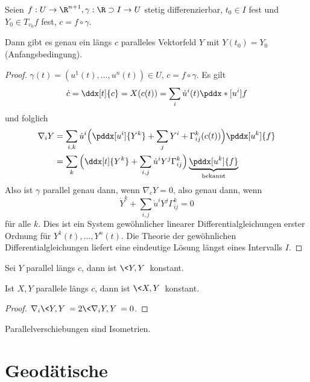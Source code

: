 \begin{st}
	Seien $f: U \to \R^{n+1}, \gamma: \R \supset I \to U$ stetig differenzierbar, $t_0 \in I$ fest und $Y_0 \in T_{v_0} f$ fest, $c = f \circ \gamma$.

	Dann gibt es genau ein längs $c$ paralleles Vektorfeld $Y$ mit $Y(t_0) = Y_0$ (Anfangsbedingung).
	\begin{proof}
		$\gamma(t) = (u^1(t), \dotsc, u^n(t)) \in U$, $c = f \circ \gamma$.
		Es gilt
		\[
			\dot c = \ddx[t]{c}
			= X(c(t))
			= \sum_i \dot u^i(t) \pddx*[u^i]{f}
		\]
		und folglich
		\begin{align*}
			\nabla_i Y
			&= \sum_{i,k} \dot u^i \Big( \pddx[u^i]{Y^k} + \sum_j Y^i + \Gamma_{ij}^k(c(t)) \Big) \pddx[u^k]{f} \\
			&= \sum_{k} \Big( \ddx[t]{Y^k} + \sum_{i,j} \dot u^i Y^j \Gamma_{ij}^k \Big) \underbrace{\pddx[u^k]{f}}_{\text{bekannt}}
		\end{align*}
		Also ist $\gamma$ parallel genau dann, wenn $\nabla_c Y = 0$, also genau dann, wenn
		\[
			\dot Y^k + \sum_{i,j} \dot u^i Y^j \Gamma_{ij}^k = 0
		\]
		für alle $k$.
		Dies ist ein System gewöhnlicher linearer Differentialgleichungen erster Ordnung für $Y^1(t), \dotsc, Y^n(t)$.
		Die Theorie der gewöhnlichen Differentialgleichungen liefert eine eindeutige Lösung längst eines Intervalls $I$.
	\end{proof}
\end{st}

\begin{kor}
	Sei $Y$ parallel längs $c$, dann ist $\<Y, Y\>$ konstant.

	Ist $X, Y$ parallele längs $c$, dann ist $\<X, Y\>$ konstant.
	\begin{proof}
		$\nabla_i \<Y, Y\> = 2 \<\nabla_i Y, Y\> = 0$.
	\end{proof}
	\begin{note}
		Parallelverschiebungen sind Isometrien.
	\end{note}
\end{kor}

\section{Geodätische}

